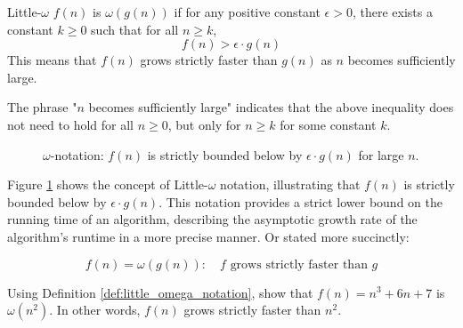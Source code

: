 \begin{definition}{Little-$\omega$}\label{def:little_omega_notation}
    $f(n)$ is $\omega(g(n))$ if for any positive constant $\epsilon > 0$, there exists a constant $k \geq 0$ such that for all $n \geq k$,
    \medskip
    \[
    f(n) > \epsilon \cdot g(n)
    \]
    \medskip
    This means that $f(n)$ grows strictly faster than $g(n)$ as $n$ becomes sufficiently large.
\end{definition}

The phrase "$n$ becomes sufficiently large" indicates that the above inequality does not need to hold for all $n \geq 0$, but only for $n \geq k$ for some constant $k$.

\begin{figure}[h]
    \centering
    \caption{$\omega$-notation: $f(n)$ is strictly bounded below by $\epsilon \cdot g(n)$ for large $n$.}
    \label{fig:little_omega_notation}
\end{figure}

Figure \ref{fig:little_omega_notation} shows the concept of Little-$\omega$ notation, illustrating that $f(n)$ is strictly bounded below by $\epsilon \cdot g(n)$. This notation provides a strict lower bound on the running time of an algorithm, describing the asymptotic growth rate of the algorithm's runtime in a more precise manner. Or stated more succinctly:

\[
f(n)=\omega(g(n)): \quad f \text{ grows strictly faster than } g
\]

\begin{example}
    Using Definition \ref{def:little_omega_notation}, show that $f(n)=n^3 + 6n + 7$ is $\omega(n^2)$. In other words, $f(n)$ grows strictly faster than $n^2$.
\end{example}

